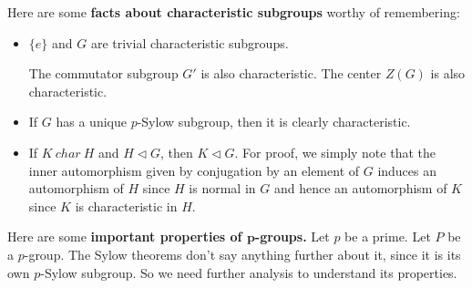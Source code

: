 \documentclass[12pt]{article}
\begin{document}
Here are some {\bf facts about characteristic subgroups} worthy of remembering:
\begin{itemize}
\item $\{e\}$ and $G$ are trivial characteristic subgroups.

The commutator subgroup $G'$ is also characteristic. The center $Z(G)$
is also characteristic.

\item If $G$ has a unique $p$-Sylow subgroup, then it is clearly 
characteristic. 

\item If $K~char~H$ and $H \triangleleft G$, then $K \triangleleft G$.
For proof, we simply note that the inner automorphism given by
conjugation by an element of $G$ induces an automorphism of $H$ since
$H$ is normal in $G$ and hence an automorphism of $K$ since $K$ is
characteristic in $H$.

\end{itemize}

Here are some {\bf important properties of $\mathbf{p}$-groups.}
Let $p$ be a prime.
Let $P$ be a $p$-group. The Sylow theorems don't say anything further
about it, since it is its own $p$-Sylow subgroup. So we need further
analysis to understand its properties.
\end{document}
